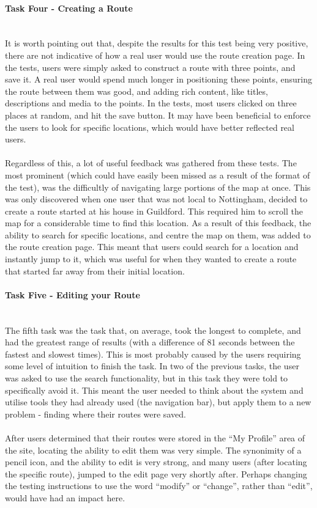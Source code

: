 \paragraph{Task Four - Creating a Route}\ \\
It is worth pointing out that, despite the results for this test being very positive, there are not indicative of how a real user would use the route creation page. In the tests, users were simply asked to construct a route with three points, and save it. A real user would spend much longer in positioning these points, ensuring the route between them was good, and adding rich content, like titles, descriptions and media to the points. In the tests, most users clicked on three places at random, and hit the save button. It may have been beneficial to enforce the users to look for specific locations, which would have better reflected real users.\ \\
\ \\
Regardless of this, a lot of useful feedback was gathered from these tests. The most prominent (which could have easily been missed as a result of the format of the test), was the difficultly of navigating large portions of the map at once. This was only discovered when one user that was not local to Nottingham, decided to create a route started at his house in Guildford. This required him to scroll the map for a considerable time to find this location. As a result of this feedback, the ability to search for specific locations, and centre the map on them, was added to the route creation page. This meant that users could search for a location and instantly jump to it, which  was useful for when they wanted to create a route that started far away from their initial location.
\ \\
\paragraph{Task Five - Editing your Route}\ \\
The fifth task was the task that, on average, took the longest to complete, and had the greatest range of results (with a difference of 81 seconds between the fastest and slowest times). This is most probably caused by the users requiring some level of intuition to finish the task. In two of the previous tasks, the user was asked to use the search functionality, but in this task they were told to specifically avoid it. This meant the user needed to think about the system and utilise tools they had already used (the navigation bar), but apply them to a new problem - finding where their routes were saved.\ \\
\ \\
After users determined that their routes were stored in the ``My Profile'' area of the site, locating the ability to edit them was very simple. The synonimity of a pencil icon, and the ability to edit is very strong, and many users (after locating the specific route), jumped to the edit page very shortly after. Perhaps changing the testing instructions to use the word ``modify'' or ``change'', rather than ``edit'', would have had an impact here.

